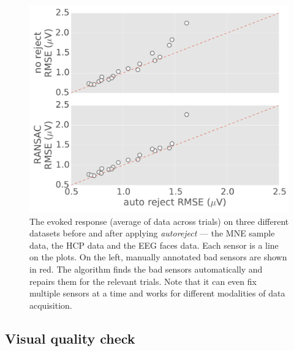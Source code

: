 \begin{figure}[htb!]
	\centering
	\includegraphics[width=0.9\linewidth]{figures/figure5.pdf}
    \caption[The evoked response (average of data across trials) on three different datasets before and after applying \emph{autoreject}]{The evoked response (average of data across trials) on three different datasets before and after applying \emph{autoreject} --- the MNE sample data, the HCP data and the EEG faces data. Each sensor is a line on the plots. On the left, manually annotated bad sensors are shown in red. The algorithm finds the bad sensors automatically and repairs them for the relevant trials. Note that it can even fix multiple sensors at a time and works for different modalities of data acquisition.}
    \label{fig:sample_evoked}
\end{figure}

\subsection{Visual quality check}

